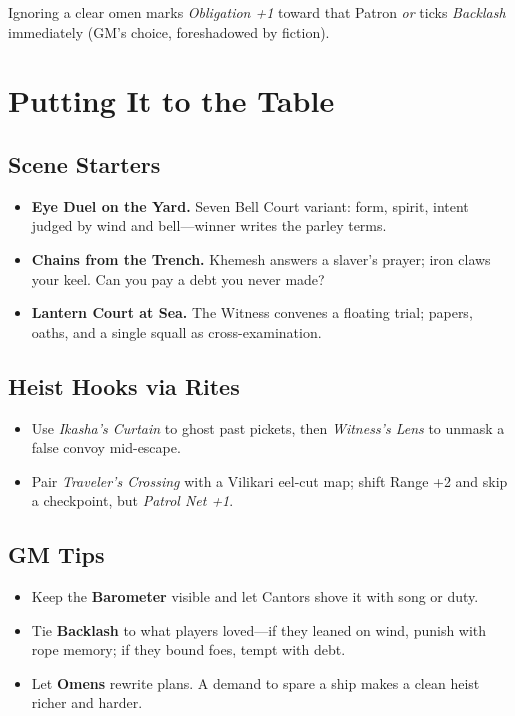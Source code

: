 \documentclass[11pt,oneside]{book}
\begin{document}
Ignoring a clear omen marks \emph{Obligation +1} toward that Patron \emph{or} ticks \emph{Backlash} immediately (GM's choice, foreshadowed by fiction).

\section{Putting It to the Table}

\subsection*{Scene Starters}
\begin{itemize}[leftmargin=*,itemsep=2pt]
  \item \textbf{Eye Duel on the Yard.} Seven Bell Court variant: form, spirit, intent judged by wind and bell---winner writes the parley terms.
  \item \textbf{Chains from the Trench.} Khemesh answers a slaver's prayer; iron claws your keel. Can you pay a debt you never made?
  \item \textbf{Lantern Court at Sea.} The Witness convenes a floating trial; papers, oaths, and a single squall as cross-examination.
\end{itemize}

\subsection*{Heist Hooks via Rites}
\begin{itemize}[leftmargin=*,itemsep=2pt]
  \item Use \emph{Ikasha's Curtain} to ghost past pickets, then \emph{Witness's Lens} to unmask a false convoy mid-escape.
  \item Pair \emph{Traveler's Crossing} with a Vilikari eel-cut map; shift Range +2 and skip a checkpoint, but \emph{Patrol Net +1}.
\end{itemize}

\subsection*{GM Tips}
\begin{itemize}[leftmargin=*,itemsep=2pt]
  \item Keep the \textbf{Barometer} visible and let Cantors shove it with song or duty.
  \item Tie \textbf{Backlash} to what players loved---if they leaned on wind, punish with rope memory; if they bound foes, tempt with debt.
  \item Let \textbf{Omens} rewrite plans. A demand to spare a ship makes a clean heist richer and harder.
\end{itemize}
\end{document}
